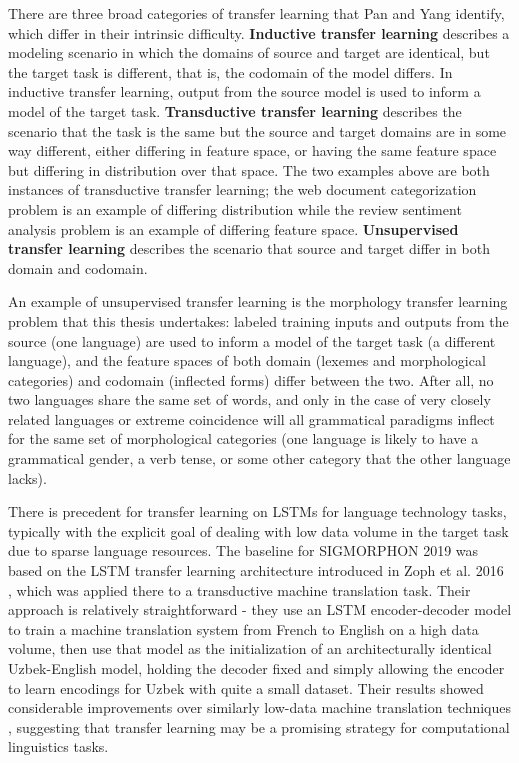 There are three broad categories of transfer learning that Pan and Yang identify, which differ in their intrinsic difficulty. \textbf{Inductive transfer learning} describes a modeling scenario in which the domains of source and target are identical, but the target task is different, that is, the codomain of the model differs. In inductive transfer learning, output from the source model is used to inform a model of the target task. \textbf{Transductive transfer learning} describes the scenario that the task is the same but the source and target domains are in some way different, either differing in feature space, or having the same feature space but differing in distribution over that space. The two examples above are both instances of transductive transfer learning; the web document categorization problem is an example of differing distribution while the review sentiment analysis problem is an example of differing feature space. \textbf{Unsupervised transfer learning} describes the scenario that source and target differ in both domain and codomain. 

An example of unsupervised transfer learning is the morphology transfer learning problem that this thesis undertakes: labeled training inputs and outputs from the source (one language) are used to inform a model of the target task (a different language), and the feature spaces of both domain (lexemes and morphological categories) and codomain (inflected forms) differ between the two. After all, no two languages share the same set of words, and only in the case of very closely related languages or extreme coincidence will all grammatical paradigms inflect for the same set of morphological categories (one language is likely to have a grammatical gender, a verb tense, or some other category that the other language lacks).

There is precedent for transfer learning on LSTMs for language technology tasks, typically with the explicit goal of dealing with low data volume in the target task due to sparse language resources. The baseline for SIGMORPHON 2019 was based on the LSTM transfer learning architecture introduced in Zoph et al. 2016 \parencite{McCarthy2019}, which was applied there to a transductive machine translation task. Their approach is relatively straightforward - they use an LSTM encoder-decoder model to train a machine translation system from French to English on a high data volume, then use that model as the initialization of an architecturally identical Uzbek-English model, holding the decoder fixed and simply allowing the encoder to learn encodings for Uzbek with quite a small dataset. Their results showed considerable improvements over similarly low-data machine translation techniques \parencite{Zoph2016}, suggesting that transfer learning may be a promising strategy for computational linguistics tasks.

